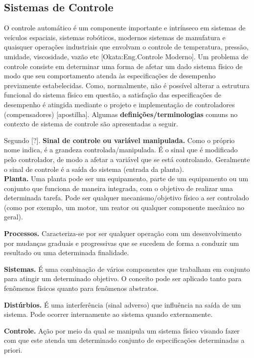 \subsection{Sistemas de Controle}

O controle automático é um componente importante e intrínseco em sistemas de veículos espaciais, sistemas robóticos, modernos sistemas de manufatura e quaisquer operações industriais que envolvam o controle de temperatura, pressão, umidade, viscosidade, vazão etc [Okata:Eng.Controle Moderno]. Um problema de controle consiste em determinar uma forma de afetar um dado sistema físico de modo que seu comportamento atenda às especificações de desempenho previamente estabelecidas. Como, normalmente, não é possível alterar a estrutura funcional do sistema físico em questão, a satisfação das especificações de desempenho é atingida mediante o projeto e implementação de controladores (compensadores) [apostilha]. Algumas \textbf{definições/terminologias} comuns no contexto de sistema de controle são apresentadas a seguir.

Segundo [?].
\textbf{Sinal de controle ou variável manipulada.} Como o próprio nome indica, é a grandeza controlada/manipulada. É o sinal que é modificado pelo controlador, de modo a afetar a variável que se está controlando. Geralmente o sinal de controle é a saída do sistema (entrada da planta).\\

\textbf{Planta.} Uma planta pode ser um equipamento, parte de um equipamento ou um conjunto que funciona de maneira integrada, com o objetivo de realizar uma determinada tarefa. Pode ser qualquer mecanismo/objetivo físico a ser controlado (como por exemplo, um motor, um reator ou qualquer componente mecânico no geral).

\textbf{Processos.} Caracteriza-se por ser qualquer operação com um desenvolvimento por mudanças graduais e progressivas que se sucedem de forma a conduzir um resultado ou uma determinada finalidade.

\textbf{Sistemas.} É uma combinação de vários componentes que trabalham em conjunto para atingir um determinado objetivo. O conceito pode ser aplicado tanto para fenômenos físicos quanto para fenômenos abstratos.

\textbf{Distúrbios.} É uma interferência (sinal adverso) que influência na saída de um sistema. Pode ocorrer internamente ao sistema quando externamente.


\textbf{Controle.} Ação por meio da qual se manipula um sistema físico visando fazer com que este atenda um determinado conjunto de especificações determinadas a priori.

